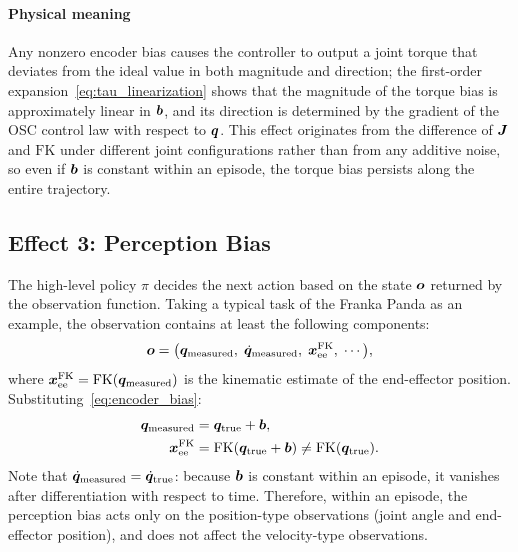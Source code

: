 \paragraph{Physical meaning} Any nonzero encoder bias causes the controller to output a joint torque that deviates from the ideal value in both magnitude and direction; the first-order expansion~\cref{eq:tau_linearization} shows that the magnitude of the torque bias is approximately linear in $\bm{b}$, and its direction is determined by the gradient of the OSC control law with respect to $\bm{q}$. This effect originates from the difference of $\bm{J}$ and $\text{FK}$ under different joint configurations rather than from any additive noise, so even if $\bm{b}$ is constant within an episode, the torque bias persists along the entire trajectory.

\subsection{Effect 3: Perception Bias}\label{subsec:effect3}

The high-level policy $\pi$ decides the next action based on the state $\bm{o}$ returned by the observation function. Taking a typical task of the Franka Panda as an example, the observation contains at least the following components:
\begin{equation}
  \bm{o} = \big(\bm{q}_{\text{measured}},\; \dot{\bm{q}}_{\text{measured}},\; \bm{x}_{\text{ee}}^{\text{FK}},\; \cdots\big),
  \label{eq:obs_structure}
\end{equation}
where $\bm{x}_{\text{ee}}^{\text{FK}} = \text{FK}(\bm{q}_{\text{measured}})$ is the kinematic estimate of the end-effector position. Substituting~\cref{eq:encoder_bias}:
\begin{align}
  \bm{q}_{\text{measured}} &= \bm{q}_{\text{true}} + \bm{b}, \label{eq:obs_q_bias}\\
  \bm{x}_{\text{ee}}^{\text{FK}} &= \text{FK}(\bm{q}_{\text{true}} + \bm{b}) \neq \text{FK}(\bm{q}_{\text{true}}).
  \label{eq:obs_x_bias}
\end{align}
Note that $\dot{\bm{q}}_{\text{measured}} = \dot{\bm{q}}_{\text{true}}$: because $\bm{b}$ is constant within an episode, it vanishes after differentiation with respect to time. Therefore, within an episode, the perception bias acts only on the position-type observations (joint angle and end-effector position), and does not affect the velocity-type observations.

